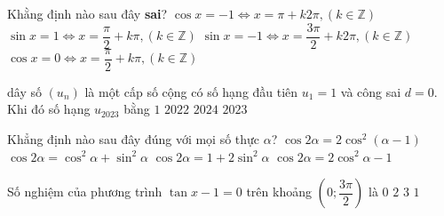 \begin{ex}%
	Khằng định nào sau đây \textbf{sai}?
	\choice
	{$\cos x=-1 \Leftrightarrow x=\pi+k 2 \pi,(k \in \mathbb{Z})$}
	{\True $\sin x=1 \Leftrightarrow x=\dfrac{\pi}{2}+k \pi,(k \in \mathbb{Z})$}
	{$\sin x=-1 \Leftrightarrow x=\dfrac{3 \pi}{2}+k 2 \pi,(k \in \mathbb{Z})$}
	{$\cos x=0 \Leftrightarrow x=\dfrac{\pi}{2}+k \pi,(k \in \mathbb{Z})$}
\end{ex}
\begin{ex}%
dây số $\left(u_{n}\right)$ là một cấp số cộng có số hạng đầu tiên $u_1=1$ và công sai $d=0$. Khi đó số hạng $u_{2023}$ bằng
\choice
{\True $1$}
{$2022$}
{$2024$}
{$2023$}
\end{ex}

\begin{ex}%
	Khẳng định nào sau đây đúng với mọi số thực $\alpha$?
	\choice
	{$\cos 2 \alpha=2 \cos ^2(\alpha-1)$}
	{$\cos 2 \alpha=\cos ^2 \alpha+\sin ^2 \alpha$}
	{$\cos 2 \alpha=1+2 \sin ^2 \alpha$}
	{\True $\cos 2 \alpha=2 \cos ^2 \alpha-1$}
	\end{ex}
\begin{ex}%
Số nghiệm của phương trình  $\tan x-1=0$ trên khoảng $\left(0 ; \dfrac{3 \pi}{2}\right)$ là 
		\choice
		{$0$}
		{\True $2$}
		{$3$}
		{$1$}
	\end{ex}
	
